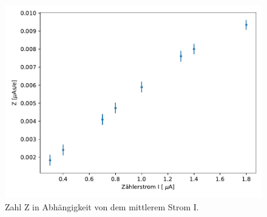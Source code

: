 \begin{figure}
  \label{fig:I_Z}
  \centering
  \includegraphics[width=\textwidth]{Aufgabe_Bestimmung_des_Zaehlrohrstroms.pdf}
  \caption{Zahl Z in Abhängigkeit von dem mittlerem Strom I.}
\end{figure}

